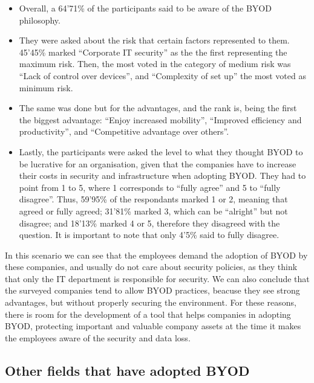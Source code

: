 \begin{itemize}
	\item Overall, a 64'71\% of the participants said to be aware of the BYOD philosophy.
	\item They were asked about the risk that certain factors represented to them. 45'45\% marked ``Corporate IT security'' as the the first representing the maximum risk. Then, the most voted in the category of medium risk was ``Lack of control over devices'', and ``Complexity of set up'' the most voted as minimum risk.
	\item The same was done but for the advantages, and the rank is, being the first the biggest advantage: ``Enjoy increased mobility'', ``Improved efficiency and productivity'', and ``Competitive advantage over others''.
	\item Lastly, the participants were asked the level to what they thought BYOD to be lucrative for an organisation, given that the companies have to increase their costs in security and infrastructure when adopting BYOD. They had to point from 1 to 5, where 1 corresponds to ``fully agree'' and 5 to ``fully disagree''. Thus, 59'95\% of the respondants marked 1 or 2, meaning that agreed or fully agreed; 31'81\% marked 3, which can be ``alright'' but not disagree; and 18'13\% marked 4 or 5, therefore they disagreed with the question. It is important to note that only 4'5\% said to fully disagree.
\end{itemize}

In this scenario we can see that the employees demand the adoption of BYOD by these companies, and usually do not care about security policies, as they think that only the IT department is responsible for security. We can also conclude that the surveyed companies tend to allow BYOD practices, beacuse they see strong advantages, but without properly securing the environment. For these reasons, there is room for the development of a tool that helps companies in adopting BYOD, protecting important and valuable company assets at the time it makes the employees aware of the security and data loss.

\subsection{Other fields that have adopted BYOD}
\label{subsec:byodother}

